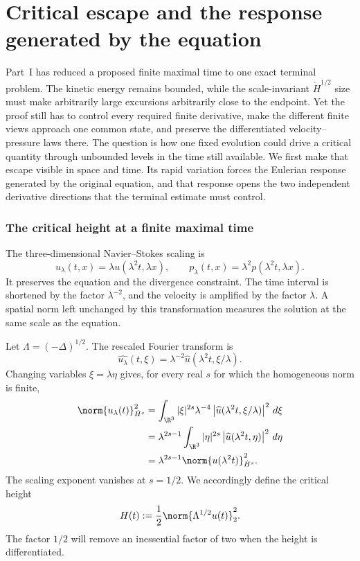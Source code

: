 \part{Critical escape and the response generated by the equation}

Part~I has reduced a proposed finite maximal time to one exact terminal
problem.  The kinetic energy remains bounded, while the scale-invariant
\(\dot H^{1/2}\) size must make arbitrarily large excursions arbitrarily
close to the endpoint.  Yet the proof still has to control every required
finite derivative, make the different finite views approach one common
state, and preserve the differentiated velocity--pressure laws there.  The
question is how one fixed evolution could drive a critical quantity through
unbounded levels in the time still available.  We first make that escape
visible in space and time.  Its rapid variation forces the Eulerian response
generated by the original equation, and that response opens the two
independent derivative directions that the terminal estimate must control.

\section{The critical height at a finite maximal time}

The three-dimensional Navier--Stokes scaling is
\begin{equation*}
 u_\lambda(t,x)=\lambda u(\lambda^2t,\lambda x),
 \qquad
 p_\lambda(t,x)=\lambda^2p(\lambda^2t,\lambda x).
\end{equation*}
It preserves the equation and the divergence constraint.  The time interval
is shortened by the factor \(\lambda^{-2}\), and the velocity is amplified by
the factor \(\lambda\).  A spatial norm left unchanged by this transformation
measures the solution at the same scale as the equation.

Let \(\Lambda=(-\Delta)^{1/2}\).  The rescaled Fourier transform is
\begin{equation*}
 \widehat{u_\lambda}(t,\xi)
 =\lambda^{-2}\widehat u(\lambda^2t,\xi/\lambda).
\end{equation*}
Changing variables \(\xi=\lambda\eta\) gives, for every real \(s\) for which
the homogeneous norm is finite,
\begin{align*}
 \norm{u_\lambda(t)}_{\dot H^s}^2
 &=\int_{\R^3}|\xi|^{2s}\lambda^{-4}
   \left|\widehat u(\lambda^2t,\xi/\lambda)\right|^2\,d\xi
 \\
 &=\lambda^{2s-1}
   \int_{\R^3}|\eta|^{2s}
   \left|\widehat u(\lambda^2t,\eta)\right|^2\,d\eta
 \\
 &=\lambda^{2s-1}
   \norm{u(\lambda^2t)}_{\dot H^s}^2.
\end{align*}
The scaling exponent vanishes at \(s=1/2\).  We accordingly define the
critical height
\begin{equation*}
 H(t):=\frac12\norm{\Lambda^{1/2}u(t)}_2^2.
\end{equation*}
The factor \(1/2\) will remove an inessential factor of two when the height is
differentiated.

